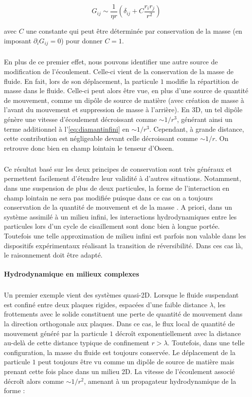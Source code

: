 \begin{equation}
	G_{ij} \sim \frac{1}{\eta r}\left( \delta_{ij}+C\frac{r_ir_j}{r^2} \right)
	\label{eq:diamantinfini}
\end{equation}

\noindent avec $C$ une constante qui peut être déterminée par conservation de la masse (en imposant $\partial_i G_{ij}=0$) pour donner $C=1$.

\subparagraph{}En plus de ce premier effet, nous pouvons identifier une autre source de modification de l'écoulement. Celle-ci vient de la conservation de la masse de fluide. En fait, lors de son déplacement, la particule $1$ modifie la répartition de masse dans le fluide. Celle-ci peut alors être vue, en plus d'une source de quantité de mouvement, comme un dipôle de source de matière (avec création de masse à l'avant du mouvement et suppression de masse à l'arrière). En 3D, un tel dipôle génère une vitesse d'écoulement décroissant comme $\sim 1/r^3$, générant ainsi un terme additionnel à l'\autoref{eq:diamantinfini} en $\sim 1/r^3$. Cependant, à grande distance, cette contribution est négligeable devant celle décroissant comme $\sim 1/r$. On retrouve donc bien en champ lointain le tenseur d'Oseen.

\subparagraph{}Ce résultat basé sur les deux principes de conservation sont très généraux et permettent facilement d'étendre leur validité à d'autres situations. Notamment, dans une suspension de plus de deux particules, la forme de l'interaction en champ lointain ne sera pas modifiée puisque dans ce cas on a toujours conservation de la quantité de mouvement et de la masse \cite{diamant_hydrodynamic_2009}. A priori, dans un système assimilé à un milieu infini, les interactions hydrodynamiques entre les particules lors d'un cycle de cisaillement sont donc bien à longue portée. Toutefois une telle approximation de milieu infini est parfois non valable dans les dispositifs expérimentaux réalisant la transition de réversibilité. Dans ces cas là, le raisonnement doit être adapté.

\paragraph{Hydrodynamique en milieux complexes}

\subparagraph{}Un premier exemple vient des systèmes quasi-2D. Lorsque le fluide suspendant est confiné entre deux plaques rigides, espacées d'une faible distance $\lambda$, les frottements avec le solide constituent une perte de quantité de mouvement dans la direction orthogonale aux plaques. Dans ce cas, le flux local de quantité de mouvement généré par la particule $1$ décroît exponentiellement avec la distance au-delà de cette distance typique de confinement $r>\lambda$. Toutefois, dans une telle configuration, la masse du fluide est toujours conservée. Le déplacement de la particule $1$ peut toujours être vu comme un dipôle de source de matière mais prenant cette fois place dans un milieu 2D. La vitesse de l'écoulement associé décroît alors comme $\sim 1/r^2$, amenant à un propagateur hydrodynamique de la forme :

